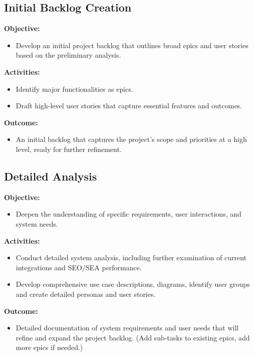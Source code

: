 \documentclass[12pt,a4paper]{article}
\begin{document}
\subsection{Initial Backlog Creation}

\noindent \textbf{Objective:}
\begin{itemize}
    \item Develop an initial project backlog that outlines broad epics and user stories based on the preliminary analysis.
\end{itemize}

\noindent \textbf{Activities:}
\begin{itemize}
    \item Identify major functionalities as epics.
    \item Draft high-level user stories that capture essential features and outcomes.
\end{itemize}

\noindent \textbf{Outcome:}
\begin{itemize}
    \item An initial backlog that captures the project's scope and priorities at a high level, ready for further refinement.
\end{itemize}
\subsection{Detailed Analysis}

\noindent \textbf{Objective:}
\begin{itemize}
    \item Deepen the understanding of specific requirements, user interactions, and system needs.
\end{itemize}

\noindent \textbf{Activities:}
\begin{itemize}
    \item Conduct detailed system analysis, including further examination of current integrations and SEO/SEA performance.
    \item Develop comprehensive use case descriptions, diagrams, identify user groups and create detailed personas and user stories.
\end{itemize}

\noindent \textbf{Outcome:}
\begin{itemize}
    \item Detailed documentation of system requirements and user needs that will refine and expand the project backlog. (Add sub-tasks to existing epics, add more epics if needed.)
\end{itemize}
\end{document}
